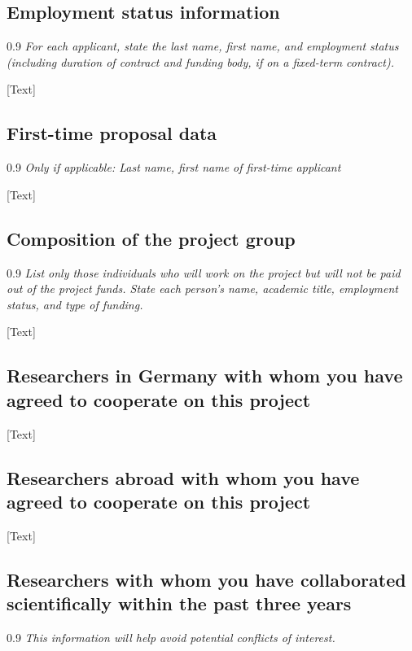 \documentclass[a4paper,11pt]{article}
\newenvironment{comment}{\begin{spacing}{0.9}\footnotesize\it}{\end{spacing}}
\begin{document}
\subsection{Employment status information}
\begin{comment}
  For each applicant, state the last name, first name, and employment status (including duration of contract and funding body, if on a fixed-term contract).  
\end{comment}

[Text]

\subsection{First-time proposal data}
\begin{comment}
  Only if applicable: Last name, first name of first-time applicant
\end{comment}

[Text]

\subsection{Composition of the project group}
\begin{comment}
  List only those individuals who will work on the project but will not be paid out of the project funds. State each person’s name, academic title, employment status, and type of funding.
\end{comment}

[Text]

\subsection{Researchers in Germany with whom you have agreed to cooperate on this project}

[Text]

\subsection{Researchers abroad with whom you have agreed to cooperate on this project}

[Text]

\subsection{Researchers with whom you have collaborated scientifically within the past three years}
\begin{comment}
  This information will help avoid potential conflicts of interest.
\end{comment}
\end{document}

